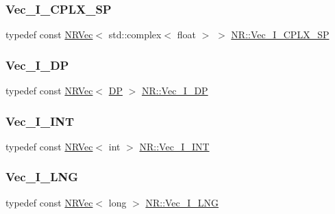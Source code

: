 \mbox{\label{namespaceNR_a34f5160508711dfeeabf170c44c6d813}} 
\subsubsection{\texorpdfstring{Vec\_I\_CPLX\_SP}{Vec\_I\_CPLX\_SP}}
{\footnotesize\ttfamily typedef const \mbox{\hyperlink{classNR_1_1NRVec}{N\+R\+Vec}}$<$ std\+::complex$<$ float $>$ $>$ \mbox{\hyperlink{namespaceNR_a34f5160508711dfeeabf170c44c6d813}{N\+R\+::\+Vec\+\_\+\+I\+\_\+\+C\+P\+L\+X\+\_\+\+SP}}}

\mbox{\label{namespaceNR_a9f943da53862537c552e2a770cb170ae}} 
\subsubsection{\texorpdfstring{Vec\_I\_DP}{Vec\_I\_DP}}
{\footnotesize\ttfamily typedef const \mbox{\hyperlink{classNR_1_1NRVec}{N\+R\+Vec}}$<$ \mbox{\hyperlink{namespaceNR_af6ff762dd605ff477b8e52387253a02a}{DP}} $>$ \mbox{\hyperlink{namespaceNR_a9f943da53862537c552e2a770cb170ae}{N\+R\+::\+Vec\+\_\+\+I\+\_\+\+DP}}}

\mbox{\label{namespaceNR_ae67ce7dc86a8a64a7ce73c3c030ff610}} 
\subsubsection{\texorpdfstring{Vec\_I\_INT}{Vec\_I\_INT}}
{\footnotesize\ttfamily typedef const \mbox{\hyperlink{classNR_1_1NRVec}{N\+R\+Vec}}$<$ int $>$ \mbox{\hyperlink{namespaceNR_ae67ce7dc86a8a64a7ce73c3c030ff610}{N\+R\+::\+Vec\+\_\+\+I\+\_\+\+I\+NT}}}

\mbox{\label{namespaceNR_ad78c9dbf732a4dd8cb20450b729296a1}} 
\subsubsection{\texorpdfstring{Vec\_I\_LNG}{Vec\_I\_LNG}}
{\footnotesize\ttfamily typedef const \mbox{\hyperlink{classNR_1_1NRVec}{N\+R\+Vec}}$<$ long $>$ \mbox{\hyperlink{namespaceNR_ad78c9dbf732a4dd8cb20450b729296a1}{N\+R\+::\+Vec\+\_\+\+I\+\_\+\+L\+NG}}}

